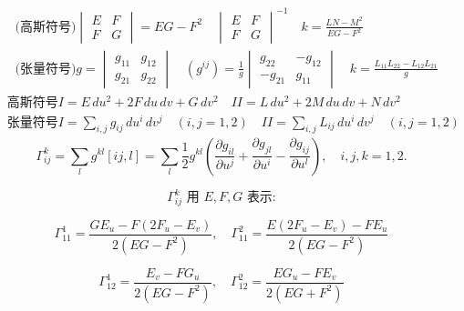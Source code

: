 \documentclass[lang=cn,10pt,thmcnt=section]{elegantbook}
\begin{document}
\begin{align*}
    &\text{(高斯符号)} 
    \begin{vmatrix}
        E & F \\
        F & G
    \end{vmatrix} = EG - F^2 \quad
    \begin{vmatrix}
        E & F \\
        F & G
    \end{vmatrix}^{-1} \quad
     k = \frac{LN - M^2}{EG - F^2} \\
    &\text{(张量符号)} 
    g = \begin{vmatrix}
        g_{11} & g_{12} \\
        g_{21} & g_{22}
    \end{vmatrix} \quad
    (g^{ij}) = \frac{1}{g} \begin{vmatrix}
        g_{22} & -g_{12} \\
        -g_{21} & g_{11}
    \end{vmatrix} \quad
    k = \frac{L_{11}L_{22} - L_{12}L_{21}}{g}
\end{align*}
\begin{align*}
    &\text{高斯符号} 
    I = E \, du^2 + 2F \, du \, dv + G \, dv^2 \quad
    II = L \, du^2 + 2M \, du \, dv + N \, dv^2 \\
    &\text{张量符号} 
    I = \sum_{i,j} g_{ij} \, du^i \, dv^j \quad (i,j = 1,2) \quad
    II = \sum_{i,j} L_{ij} \, du^i \, dv^j \quad (i,j = 1,2)
\end{align*}
\[
\Gamma_{ij}^k = \sum_{l} g^{kl} [ij,l]= \sum_{l} \frac{1}{2} g^{kl} \left( \frac{\partial g_{il}}{\partial u^j} + \frac{\partial g_{jl}}{\partial u^i} - \frac{\partial g_{ij}}{\partial u^l} \right), \quad i,j,k=1,2.
\]

\[
\Gamma_{ij}^k \text{ 用 } E, F, G \text{ 表示:}
\]

\[
\Gamma_{11}^1 = \frac{GE_u - F(2F_u - E_v)}{2(EG - F^2)}, \quad \Gamma_{11}^2 = \frac{E(2F_u - E_v) - FE_u}{2(EG - F^2)}
\]

\[
\Gamma_{12}^1 = \frac{E_v - F G_u}{2(EG - F^2)}, \quad \Gamma_{12}^2 = \frac{E G_u - F E_v}{2(EG + F^2)}
\]
\end{document}
